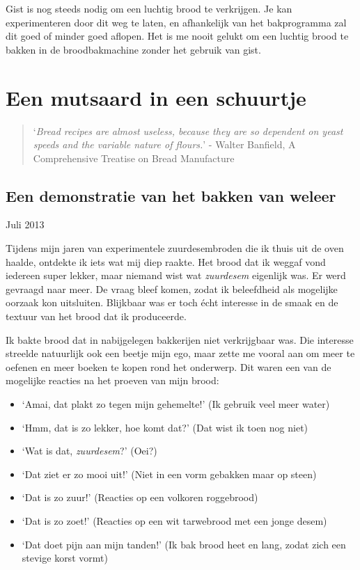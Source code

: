 \documentclass[
  11pt,
  dutch,
]{memoir}
\providecommand{\tightlist}{%
  \setlength{\itemsep}{0pt}\setlength{\parskip}{0pt}}
\begin{document}
Gist is nog steeds nodig om een luchtig brood te verkrijgen. Je kan
experimenteren door dit weg te laten, en afhankelijk van het
bakprogramma zal dit goed of minder goed aflopen. Het is me nooit gelukt
om een luchtig brood te bakken in de broodbakmachine zonder het gebruik
van gist.

\hypertarget{een-mutsaard-in-een-schuurtje}{%
\chapter{Een mutsaard in een
schuurtje}\label{een-mutsaard-in-een-schuurtje}}

\label{bokrijk}

\begin{quote}
`\emph{Bread recipes are almost useless, because they are so dependent
on yeast speeds and the variable nature of flours.}' - Walter Banfield,
A Comprehensive \mbox{Treatise} on Bread Manufacture
\end{quote}

\hypertarget{een-demonstratie-van-het-bakken-van-weleer}{%
\section{Een demonstratie van het bakken van
weleer}\label{een-demonstratie-van-het-bakken-van-weleer}}

\begin{flushright}
Juli 2013
\end{flushright}

Tijdens mijn jaren van experimentele zuurdesembroden die ik thuis uit de
oven haalde, ontdekte ik iets wat mij diep raakte. Het brood dat ik
weggaf vond iedereen super lekker, maar niemand wist wat
\emph{zuurdesem} eigenlijk was. Er werd gevraagd naar meer. De vraag
bleef komen, zodat ik beleefdheid als mogelijke oorzaak kon uitsluiten.
Blijkbaar was er toch écht interesse in de smaak en de textuur van het
brood dat ik produceerde.

Ik bakte brood dat in nabijgelegen bakkerijen niet verkrijgbaar was. Die
interesse streelde natuurlijk ook een beetje mijn ego, maar zette me
vooral aan om meer te oefenen en meer boeken te kopen rond het
onderwerp. Dit waren een van de mogelijke reacties na het proeven van
mijn brood:

\begin{itemize}
\tightlist
\item
  `Amai, dat plakt zo tegen mijn gehemelte!' (Ik gebruik veel meer
  water)
\item
  `Hmm, dat is zo lekker, hoe komt dat?' (Dat wist ik toen nog niet)
\item
  `Wat is dat, \emph{zuurdesem}?' (Oei?)
\item
  `Dat ziet er zo mooi uit!' (Niet in een vorm gebakken maar op steen)
\item
  `Dat is zo zuur!' (Reacties op een volkoren roggebrood)
\item
  `Dat is zo zoet!' (Reacties op een wit tarwebrood met een jonge desem)
\item
  `Dat doet pijn aan mijn tanden!' (Ik bak brood heet en lang, zodat
  zich een stevige korst vormt)
\end{itemize}
\end{document}
